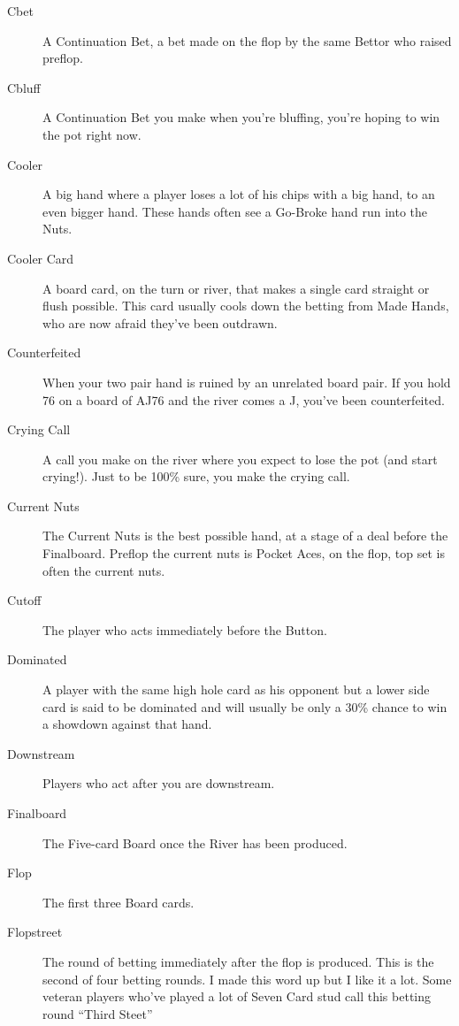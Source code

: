 \begin{description}
\item[Cbet] A Continuation Bet, a bet made on the flop by the same Bettor
who raised preflop.

\item[Cbluff] A Continuation Bet you make when you're bluffing, you're
hoping to win the pot right now.

\item[Cooler] A big hand where a player loses a lot of his chips with
a big hand, to an even bigger hand. These hands often see a Go-Broke
hand run into the Nuts.

\item[Cooler Card] A board card, on the turn or river, that makes a
single card straight or flush possible. This card usually cools down
the betting from Made Hands, who are now afraid they've been outdrawn.

\item[Counterfeited] When your two pair hand is ruined by an unrelated
board pair. If you hold 76 on a board of AJ76 and the river comes a J,
you've been counterfeited.

\item[Crying Call] A call you make on the river where you expect to
lose the pot (and start crying!). Just to be 100\% sure, you make the
crying call.

\item[Current Nuts] The Current Nuts is the best possible hand, at a
stage of a deal before the Finalboard. Preflop the current nuts is
Pocket Aces, on the flop, top set is often the current nuts.

\item[Cutoff] The player who acts immediately before the Button.

\item[Dominated] A player with the same high hole card as his opponent
but a lower side card is said to be dominated and will usually be
only a 30\% chance to win a showdown against that hand.

\item[Downstream] Players who act after you are downstream.

\item[Finalboard] The Five-card Board once the River has been
produced.

\item[Flop] The first three Board cards.

\item[Flopstreet] The round of betting immediately after the flop is
produced. This is the second of four betting rounds. I made this word
up but I like it a lot. Some veteran players who've played a lot of
Seven Card stud call this betting round ``Third Steet''


\end{description}
